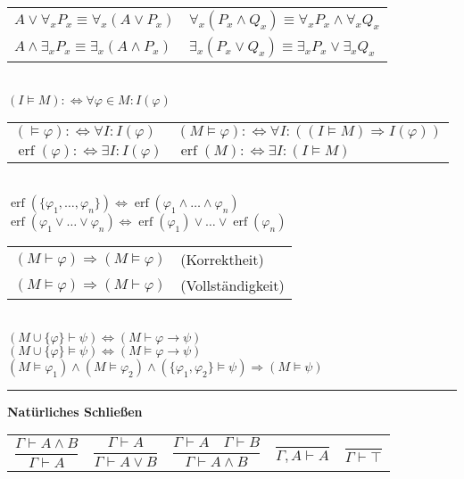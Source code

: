 \documentclass[a4paper,10pt,fleqn,twoside,twocolumn,dvipdfmx]{scrartcl}
\newcommand{\erf}{\operatorname{erf}}
\newcommand{\strong}[1]{\textsf{\textbf{#1}}}
\begin{document}
\noindent
\begin{tabular}{@{}l|l}
$A\lor\forall_{\!x} P_x \equiv \forall_{\!x}(A\lor P_x)$
&$\forall_{\!x}(P_x\land Q_x) \equiv \forall_{\!x}P_x\land\forall_{\!x}Q_x$\\
$A\land\exists_x P_x \equiv \exists_x(A\land P_x)$
&$\exists_{x}(P_x\lor Q_x) \equiv \exists_x P_x\lor\exists_x Q_x$
\end{tabular}\\
$(I\models M) :\Leftrightarrow \forall\varphi{\in}M\colon I(\varphi)$\\
\begin{tabular}{@{}l|l}
$(\models\varphi) :\Leftrightarrow \forall I\colon I(\varphi)$
& $(M\models\varphi) :\Leftrightarrow \forall I\colon ((I\models M)\Rightarrow I(\varphi))$\\
$\erf(\varphi) :\Leftrightarrow \exists I\colon I(\varphi)$
& $\erf(M) :\Leftrightarrow \exists I\colon (I\models M)$
\end{tabular}\\
$\erf(\{\varphi_1,\ldots,\varphi_n\}) \Leftrightarrow
\erf(\varphi_1\land\ldots\land\varphi_n)$\\
$\erf(\varphi_1\lor\ldots\lor\varphi_n) \Leftrightarrow
\erf(\varphi_1)\lor\ldots\lor\erf(\varphi_n)$\\
\begin{tabular}{@{}ll}
$(M\vdash\varphi)\Rightarrow (M\models\varphi)$ & (Korrektheit)\\
$(M\models\varphi)\Rightarrow (M\vdash\varphi)$ & (Vollständigkeit)
\end{tabular}\\
$(M\cup\{\varphi\}\vdash\psi)\Leftrightarrow (M\vdash \varphi\rightarrow\psi)$\\
$(M\cup\{\varphi\}\models\psi)\Leftrightarrow (M\models \varphi\rightarrow\psi)$\\
$(M\models\varphi_1)\land (M\models\varphi_2)\land (\{\varphi_1,\varphi_2\}\models\psi)
\Rightarrow (M\models\psi)$\\[-4pt]
\rule{\columnwidth}{\heavyrulewidth}
\strong{Natürliches Schließen}\\[4pt]
\begin{tabular}{@{}l@{\quad}l@{\quad}l@{\quad}l@{\quad}l}
$\dfrac{\Gamma\vdash A\land B}{\Gamma\vdash A}$
& $\dfrac{\Gamma\vdash A}{\Gamma\vdash A\lor B}$
& $\dfrac{\Gamma\vdash A\quad\Gamma\vdash B}{\Gamma\vdash A\land B}$
& $\dfrac{}{\Gamma,A\vdash A}$
& $\dfrac{}{\Gamma\vdash\top}$
\end{tabular}\\[6pt]
\end{document}
